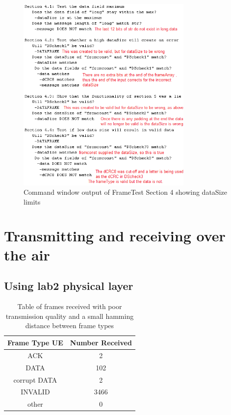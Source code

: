 \begin{figure}[p]
    \includegraphics[width=0.77\textwidth, left]{FrameTest4.PNG}
    \caption{Command window output of FrameTest Section 4 showing dataSize limits  }
    \label{fig:FrameTest4}
\end{figure}

\section{Transmitting and receiving over the air}
\subsection{Using lab2 physical layer}
\begin{table}
	\centering
		\begin{tabular}{| c | c | }
		\hline                       
		Frame Type UE & Number Received\\
		\hline
			ACK & 2\\
			DATA & 102\\
			corrupt DATA & 2\\
			INVALID & 3466\\
			other & 0\\
		\hline
		\end{tabular}
	\caption{Table of frames received with poor transmission quality and a small hamming distance between frame types}
	\label{tab:2ACK}
\end{table}

